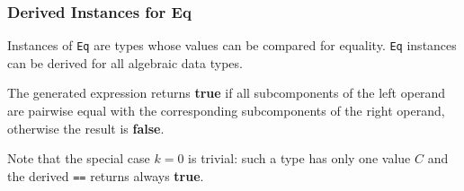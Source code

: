 \subsubsection{Derived Instances for Eq}

Instances of \texttt{Eq} are types whose values can be compared for equality. \texttt{Eq} instances can be derived for all algebraic data types.


The generated expression returns \textbf{true} if all subcomponents of the left operand are pairwise equal with the corresponding subcomponents of the right operand, otherwise the result is  \textbf{false}.

Note that the special case $k=0$ is trivial: such a type has only one value $C$ and the derived \texttt{==} returns always \textbf{true}.

